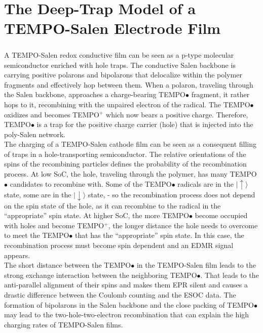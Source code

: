 \chapter{The Deep-Trap Model of a TEMPO-Salen Electrode Film}

\paragraph*{}
A TEMPO-Salen redox conductive film can be seen as a p-type molecular semiconductor enriched with hole traps. The conductive Salen backbone is carrying positive polarons and bipolarons that delocalize within the polymer fragments and effectively hop between them. When a polaron, traveling through the Salen backbone, approaches a charge-bearing TEMPO${\bullet}$ fragment, it rather hops to it, recombining with the unpaired electron of the radical. The TEMPO${\bullet}$ oxidizes and becomes TEMPO${^+}$ which now bears a positive charge. Therefore, TEMPO${\bullet}$ is a trap for the positive charge carrier (hole) that is injected into the poly-Salen network.\\
The charging of a TEMPO-Salen cathode film can be seen as a consequent filling of traps in a hole-transporting semiconductor. The relative orientations of the spins of the recombining particles defines the probability of the recombination process. At low SoC, the hole, traveling through the polymer, has many TEMPO${\bullet}$ candidates to recombine with. Some of the TEMPO${\bullet}$ radicals are in the $\vert{\uparrow\rangle}$ state, some are in the $\vert{\downarrow\rangle}$ state, - so the recombination process does not depend on the spin state of the hole, as it can recombine to the radical in the ``appropriate'' spin state. At higher SoC, the more TEMPO${\bullet}$ become occupied with holes and become TEMPO${^+}$, the longer distance the hole needs to overcome to meet the TEMPO${\bullet}$ that has the ``appropriate'' spin state. In this case, the recombination process must become spin dependent and an EDMR signal appears.\\
The short distance between the TEMPO${\bullet}$ in the TEMPO-Salen film leads to the strong exchange interaction between the neighboring TEMPO${\bullet}$. That leads to the anti-parallel alignment of their spins and makes them EPR silent and causes a drastic difference between the Coulomb counting and the ESOC data. The formation of bipolarons in the Salen backbone and the close packing of TEMPO${\bullet}$ may lead to the two-hole-two-electron recombination that can explain the high charging rates of TEMPO-Salen films.



